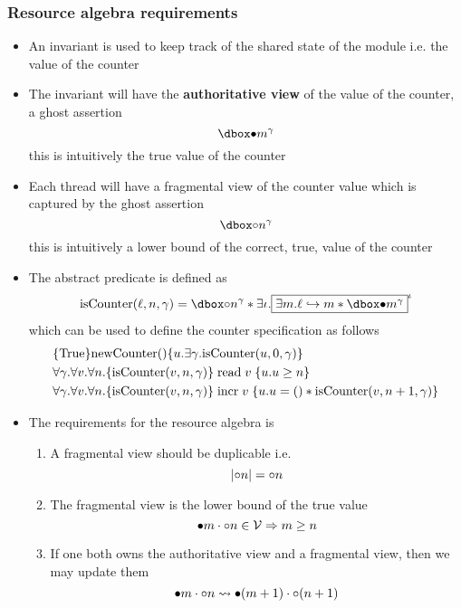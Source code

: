 \subsubsection{Resource algebra requirements}
\begin{itemize}
	\item An invariant is used to keep track of the shared state of the module i.e. the value of the counter
  \item The invariant will have the \textbf{authoritative view} of the value of the counter, a ghost assertion
  \[
    \dboxed{\auth m}^\gamma
  \]
  this is intuitively the true value of the counter
  \item Each thread will have a fragmental view of the counter value which is captured by the ghost assertion
  \[
    \dboxed{\prt n}^\gamma
  \]
  this is intuitively a lower bound of the correct, true, value of the counter
  \item The abstract predicate is defined as
  \[
    \text{isCounter}(\ell, n, \gamma) = \dboxed{\prt n}^\gamma * \exists \iota.\inv{\exists m. \ell \pointsto m * \dboxed{\auth m}^\gamma}^\iota
  \]
  which can be used to define the counter specification as follows
  \begin{align*}
    &\{\text{True}\} \text{newCounter}() \{u.\exists \gamma.\text{isCounter}(u,0,\gamma)\} \\
    &\forall \gamma. \forall v. \forall n. \{\text{isCounter}(v,n,\gamma)\} \; \text{read} \; v \; \{u.u \geq n\} \\
    &\forall \gamma. \forall v. \forall n. \{\text{isCounter}(v,n,\gamma)\} \; \text{incr} \; v \; \{u.u = () * \text{isCounter}(v, n+1, \gamma)\}
  \end{align*}

  \item The requirements for the resource algebra is
  \begin{enumerate}
    \item A fragmental view should be duplicable i.e.
    \[
      | {\circ} n | = {\circ} n \\
    \]
    \item The fragmental view is the lower bound of the true value 
    \[
      {\bullet} m \cdot {\ensuremath\circ} n \in \mathcal V \Rightarrow m \geq n
    \]  
    \item If one both owns the authoritative view and a fragmental view, then we may update them
    \[
      {\bullet} m \cdot {\ensuremath\circ} n \leadsto {\ensuremath\bullet} (m + 1) \cdot {\ensuremath\circ} (n + 1)
    \]
  \end{enumerate}
\end{itemize}

